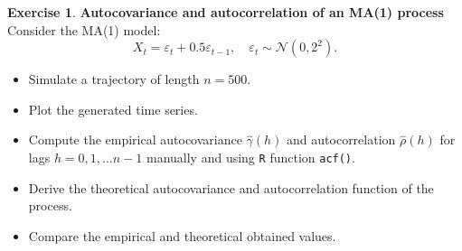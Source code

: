 \documentclass[a4,a4paper,10pt,notitlepage,english]{article}
\theoremstyle{definition}
\newtheorem{exo}{Exercise}
\begin{document}
\begin{exo}
    \textbf{Autocovariance and autocorrelation of an MA(1) process}\\

    Consider the MA(1) model:
    \[
    X_t = \varepsilon_t + 0.5 \varepsilon_{t-1}, \quad \varepsilon_t \sim \mathcal{N}(0,2^2).
    \]




    \begin{itemize}
    \item    Simulate a trajectory of length $n=500$.
     \item Plot the generated time series.
        \item Compute the empirical autocovariance $\hat{\gamma}(h)$ and autocorrelation $\hat{\rho}(h)$
        for lags $h=0,1, \ldots n-1$ manually and using \texttt{R} function \texttt{acf()}.
        \item Derive the theoretical autocovariance and autocorrelation function of the process.
        \item Compare the empirical and theoretical obtained values.
    \end{itemize}
\end{exo}

\bigskip
\end{document}
